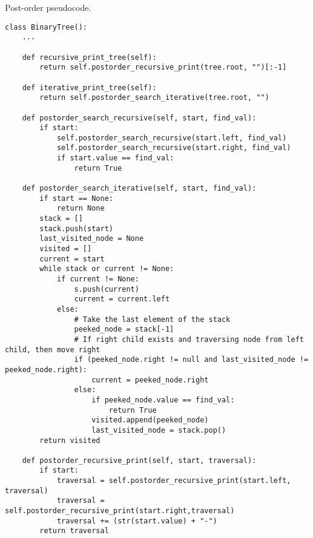 \begin{algorithm}[H]
	\DontPrintSemicolon
	\LinesNumbered
  	\;
\caption{Post-order pseudocode.}
\end{algorithm}

\begin{lstlisting}[firstnumber=1, caption={Recursive and iterative implementation of post-order traversal.}]
class BinaryTree():
	...

	def recursive_print_tree(self):
		return self.postorder_recursive_print(tree.root, "")[:-1]
	
	def iterative_print_tree(self):
		return self.postorder_search_iterative(tree.root, "")

	def postorder_search_recursive(self, start, find_val):
		if start:
			self.postorder_search_recursive(start.left, find_val)
			self.postorder_search_recursive(start.right, find_val)
			if start.value == find_val:
				return True

	def postorder_search_iterative(self, start, find_val):
		if start == None:
			return None
		stack = []
		stack.push(start)
		last_visited_node = None
		visited = []
		current = start
		while stack or current != None:
			if current != None:
				s.push(current)
				current = current.left
			else:
				# Take the last element of the stack
				peeked_node = stack[-1]
				# If right child exists and traversing node from left child, then move right
				if (peeked_node.right != null and last_visited_node != peeked_node.right):
					current = peeked_node.right
				else:
					if peeked_node.value == find_val:
						return True
					visited.append(peeked_node)
					last_visited_node = stack.pop()
		return visited

	def postorder_recursive_print(self, start, traversal):
		if start:
			traversal = self.postorder_recursive_print(start.left, traversal)
			traversal = self.postorder_recursive_print(start.right,traversal)
			traversal += (str(start.value) + "-")
		return traversal
\end{lstlisting}

